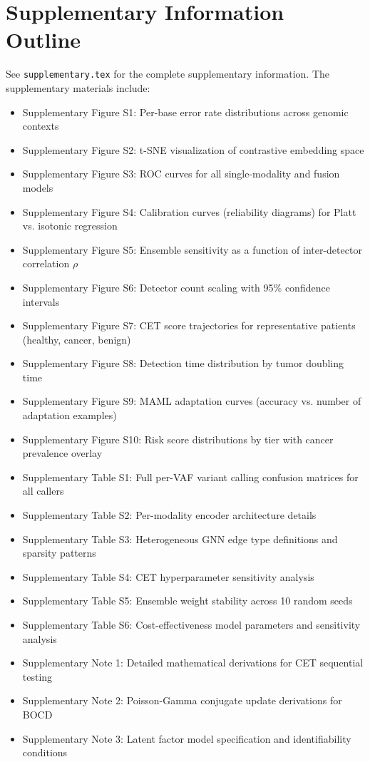 \documentclass[10pt,a4paper]{article}
\begin{document}




\newpage
\appendix

\section{Supplementary Information Outline}

See \texttt{supplementary.tex} for the complete supplementary information. The supplementary materials include:

\begin{itemize}
\item Supplementary Figure S1: Per-base error rate distributions across genomic contexts
\item Supplementary Figure S2: t-SNE visualization of contrastive embedding space
\item Supplementary Figure S3: ROC curves for all single-modality and fusion models
\item Supplementary Figure S4: Calibration curves (reliability diagrams) for Platt vs. isotonic regression
\item Supplementary Figure S5: Ensemble sensitivity as a function of inter-detector correlation $\rho$
\item Supplementary Figure S6: Detector count scaling with 95\% confidence intervals
\item Supplementary Figure S7: CET score trajectories for representative patients (healthy, cancer, benign)
\item Supplementary Figure S8: Detection time distribution by tumor doubling time
\item Supplementary Figure S9: MAML adaptation curves (accuracy vs. number of adaptation examples)
\item Supplementary Figure S10: Risk score distributions by tier with cancer prevalence overlay
\item Supplementary Table S1: Full per-VAF variant calling confusion matrices for all callers
\item Supplementary Table S2: Per-modality encoder architecture details
\item Supplementary Table S3: Heterogeneous GNN edge type definitions and sparsity patterns
\item Supplementary Table S4: CET hyperparameter sensitivity analysis
\item Supplementary Table S5: Ensemble weight stability across 10 random seeds
\item Supplementary Table S6: Cost-effectiveness model parameters and sensitivity analysis
\item Supplementary Note 1: Detailed mathematical derivations for CET sequential testing
\item Supplementary Note 2: Poisson-Gamma conjugate update derivations for BOCD
\item Supplementary Note 3: Latent factor model specification and identifiability conditions
\end{itemize}
\end{document}
